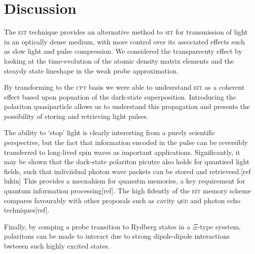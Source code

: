 \section{Discussion}
  \label{sec:polaritons_discussion}

  The \textsc{eit} technique provides an alternative method to \textsc{sit} for
  transmission of light in an optically dense medium, with more control over its
  associated effects such as slow light and pulse compression. We considered the
  transparecnty effect by looking at the time-evolution of the atomic density
  matrix elements and the steaydy state lineshape in the weak probe
  approximation.

  By transforming to the \textsc{cpt} basis we were able to undesrstand
  \textsc{eit} as a coherent effect based upon popuation of the dark-state
  superposition. Introducing the polariton quasiparticle allows us to understand
  this propagation and presents the possibility of storing and retrieving light
  pulses.

  The ability to `stop' light is clearly interesting from a purely scientific
  perspective, but the fact that information encoded in the pulse can be
  reversibly transferred to long-lived spin waves as important applications.
  Significantly, it may be shown that the dark-state polariton picutre also
  holds for quantised light fields, such that indiviidual photon wave packets
  can be stored and retrieveed.[ref lukin] This provides a mecnahism for quanutm
  memories, a key requirement for quantum information processing[ref]. The high
  fidently of the \textsc{eit} memory scheme compares favourably with other
  proposals such as cavity \textsc{qed} and photon echo techniques[ref].

  Finally, by comping a probe transition to Rydberg states in a $\Xi$-type
  sysstem, polaritons can be made to interact due to strong dipole-dipole
  interactions bwteeen such highly excited states.
